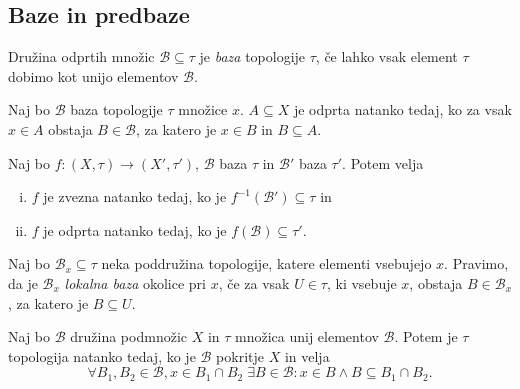 \newpage

\subsection{Baze in predbaze}


\begin{okvir}
\begin{definicija}
Družina odprtih množic $\mathcal{B} \subseteq \tau$ je
\emph{baza} topologije $\tau$, če lahko vsak
element $\tau$ dobimo kot unijo elementov $\mathcal{B}$.
\end{definicija}
\end{okvir}

\begin{trditev}
Naj bo $\mathcal{B}$ baza topologije $\tau$ množice $x$.
$A \subseteq X$ je odprta natanko tedaj, ko za vsak $x \in A$
obstaja $B \in \mathcal{B}$, za katero je $x \in B$ in
$B \subseteq A$.
\end{trditev}

\obvs

\begin{trditev}
Naj bo $f \colon (X,\tau) \to (X',\tau')$, $\mathcal{B}$ baza
$\tau$ in $\mathcal{B}'$ baza $\tau'$. Potem velja

\begin{enumerate}[i)]
\item $f$ je zvezna natanko tedaj, ko je
$f^{-1}(\mathcal{B}') \subseteq \tau$ in
\item $f$ je odprta natanko tedaj, ko je
$f(\mathcal{B}) \subseteq \tau'$.
\end{enumerate}
\end{trditev}

\obvs

\begin{definicija}
Naj bo $\mathcal{B}_x \subseteq \tau$ neka poddružina topologije,
katere elementi vsebujejo $x$. Pravimo, da je $\mathcal{B}_x$
\emph{lokalna baza} okolice pri $x$,
če za vsak $U \in \tau$, ki vsebuje $x$, obstaja
$B \in \mathcal{B}_x$, za katero je $B \subseteq U$.
\end{definicija}

\begin{trditev}
Naj bo $\mathcal{B}$ družina podmnožic $X$ in $\tau$ množica unij
elementov $\mathcal{B}$. Potem je $\tau$ topologija natanko tedaj,
ko je $\mathcal{B}$ pokritje $X$ in velja
\[
\forall B_1, B_2 \in \mathcal{B}, x \in B_1 \cap B_2 \;
\exists B \in \mathcal{B} \colon x \in B \land
B \subseteq B_1 \cap B_2.
\]
\end{trditev}

